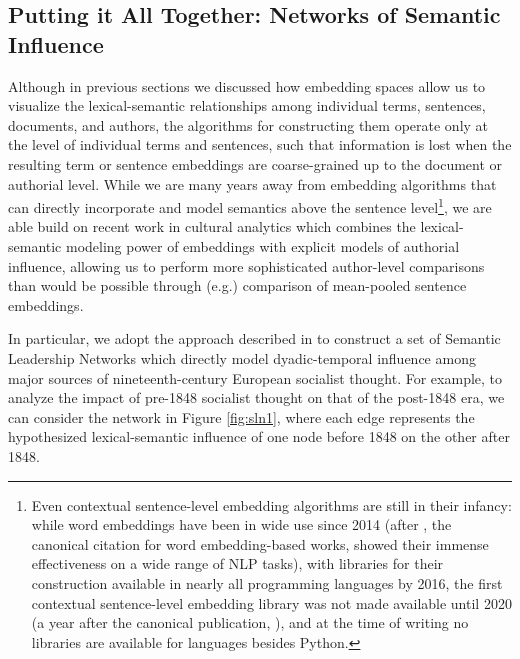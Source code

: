 \documentclass[11pt]{article}
\begin{document}



\subsection{Putting it All Together: Networks of Semantic Influence}\label{sec:sln}

Although in previous sections we discussed how embedding spaces allow us to visualize the lexical-semantic relationships among individual terms, sentences, documents, and authors, the algorithms for constructing them operate only at the level of individual terms and sentences, such that information is lost when the resulting term or sentence embeddings are coarse-grained up to the document or authorial level. While we are many years away from embedding algorithms that can directly incorporate and model semantics above the sentence level\footnote{Even contextual sentence-level embedding algorithms are still in their infancy: while word embeddings have been in wide use since 2014 (after \cite{mikolov_distributed_2013}, the canonical citation for word embedding-based works, showed their immense effectiveness on a wide range of NLP tasks), with libraries for their construction available in nearly all programming languages by 2016, the first contextual sentence-level embedding library was not made available until 2020 (a year after the canonical publication, \cite{reimers_sentencebert_2019}), and at the time of writing no libraries are available for languages besides Python.}, we are able build on recent work in cultural analytics which combines the lexical-semantic modeling power of embeddings with explicit models of authorial influence, allowing us to perform more sophisticated author-level comparisons than would be possible through (e.g.) comparison of mean-pooled sentence embeddings.

In particular, we adopt the approach described in \cite{soni_abolitionist_2021} to construct a set of Semantic Leadership Networks which directly model dyadic-temporal influence among major sources of nineteenth-century European socialist thought. For example, to analyze the impact of pre-1848 socialist thought on that of the post-1848 era, we can consider the network in Figure \ref{fig:sln1}, where each edge represents the hypothesized lexical-semantic influence of one node before 1848 on the other after 1848.
\end{document}
